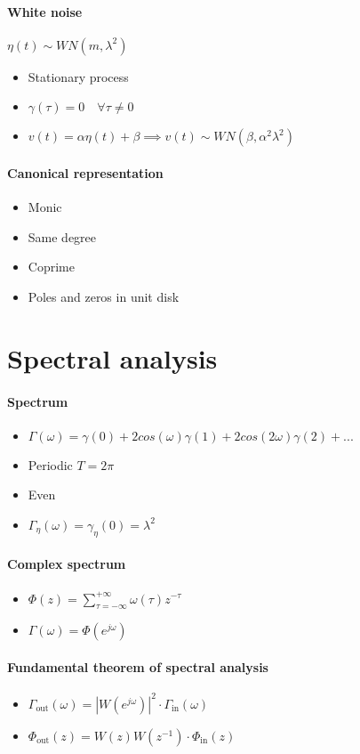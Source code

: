 \documentclass{article}
\begin{document}
\paragraph{White noise} $\eta(t)\sim WN(m,\lambda^2)$
\begin{itemize}
	\item Stationary process
	\item $\gamma(\tau)=0	\quad\forall\tau\neq0$
	\item $v(t)=\alpha \eta (t)+\beta\implies v(t)\sim WN(\beta,\alpha^2 \lambda^2)$
\end{itemize}
\paragraph{Canonical representation}
\begin{itemize}
\item Monic
\item Same degree
\item Coprime
\item Poles and zeros in unit disk
\end{itemize}
\section{Spectral analysis}
\paragraph{Spectrum}
\begin{itemize}
\item $\Gamma(\omega)=\gamma(0)+2cos(\omega)\gamma(1)+2cos(2\omega)\gamma(2)+...$
\item Periodic $T=2\pi$
\item Even
\item $\Gamma_\eta(\omega)=\gamma_\eta(0)=\lambda^2$
\end{itemize}
\paragraph{Complex spectrum}
\begin{itemize}
\item $\Phi(z)=\sum_{\tau =-\infty}^{+\infty} \omega(\tau)z^{-\tau}$
\item $\Gamma(\omega)=\Phi(e^{j\omega})$
\end{itemize}
\paragraph{Fundamental theorem of spectral analysis}
\begin{itemize}
\item $\Gamma_{\text{out}}(\omega)=|W(e^{j\omega})|^2 \cdot \Gamma_{\text{in}}(\omega)$
\item $\Phi_{\text{out}}(z)=W(z)W(z^{-1}) \cdot \Phi_{\text{in}}(z)$
\end{itemize}
\end{document}
